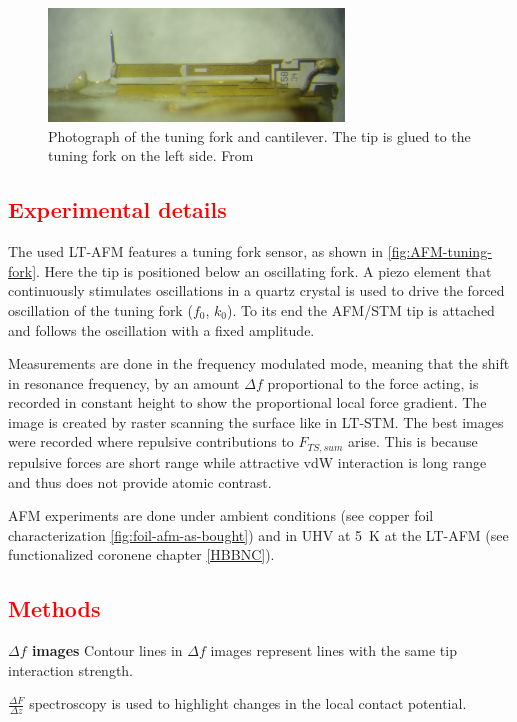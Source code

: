 \begin{figure}\centering
	\includegraphics[width=0.7\textwidth]{./images/AFM-qplus-photograph}
	\caption{Photograph of the tuning fork and cantilever. The tip is glued to the tuning fork on the left side. From \cite{he_bottom-up_2017}}
	\label{fig:AFM-tuning-fork}
\end{figure}

\subsection{\textcolor{red}{\textbf{Experimental details}}}
The used LT-AFM features a tuning fork sensor, as shown in \autoref{fig:AFM-tuning-fork}. Here the tip is positioned below an oscillating fork.  A piezo element that continuously stimulates oscillations in a quartz crystal is used to drive the forced oscillation of the tuning fork ($f_0$, $k_0$). To its end the AFM/STM tip is attached and follows the oscillation with a fixed amplitude.

Measurements are done in the frequency modulated mode, meaning that the shift in resonance frequency, by an amount $\Delta f$  proportional to the force acting, is recorded in constant height to show the proportional local force gradient. The image is created by raster scanning the surface like in LT-STM. The best images were recorded where repulsive contributions to $F_{TS,sum}$ arise. This is because repulsive forces are short range while attractive vdW interaction is long range and thus does not provide atomic contrast.

AFM experiments are done under ambient conditions (see copper foil characterization \ref{fig:foil-afm-as-bought}) and in UHV at \SI{5}{\kelvin} at the LT-AFM (see functionalized coronene chapter \ref{HBBNC}).

\subsection{\textcolor{red}{\textbf{Methods}}}
\textbf{$\Delta f $ images} 
Contour lines in $\Delta f$ images represent lines with the same tip interaction strength.

\textbf{$\frac{\Delta F}{\Delta z}$} spectroscopy is used to highlight changes in the local contact potential.